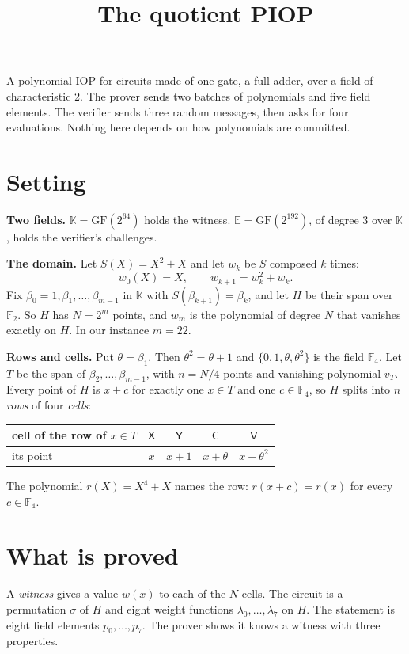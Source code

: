 \documentclass[11pt]{article}
\title{\vspace{-2.5em}The quotient PIOP}
\author{}
\date{\vspace{-3.5em}}
\newcommand{\K}{\mathbb{K}}
\newcommand{\E}{\mathbb{E}}
\newcommand{\F}{\mathbb{F}}
\newcommand{\cX}{\mathsf{X}}
\newcommand{\cY}{\mathsf{Y}}
\newcommand{\cC}{\mathsf{C}}
\newcommand{\cV}{\mathsf{V}}
\newcommand{\head}[1]{\par\vspace{0.35em}\textbf{#1}\enspace}
\begin{document}
\maketitle

A polynomial IOP for circuits made of one gate, a full adder, over a field of characteristic 2. The prover sends two batches of polynomials and five field elements. The verifier sends three random messages, then asks for four evaluations. Nothing here depends on how polynomials are committed.

\section{Setting}

\head{Two fields.} $\K = \mathrm{GF}(2^{64})$ holds the witness. $\E = \mathrm{GF}(2^{192})$, of degree 3 over $\K$, holds the verifier's challenges.

\head{The domain.} Let $S(X) = X^2 + X$ and let $w_k$ be $S$ composed $k$ times:
\[
  w_0(X) = X, \qquad w_{k+1} = w_k^2 + w_k .
\]
Fix $\beta_0 = 1, \beta_1, \dots, \beta_{m-1}$ in $\K$ with $S(\beta_{k+1}) = \beta_k$, and let $H$ be their span over $\F_2$. So $H$ has $N = 2^m$ points, and $w_m$ is the polynomial of degree $N$ that vanishes exactly on $H$. In our instance $m = 22$.

\head{Rows and cells.} Put $\theta = \beta_1$. Then $\theta^2 = \theta + 1$ and $\{0, 1, \theta, \theta^2\}$ is the field $\F_4$. Let $T$ be the span of $\beta_2, \dots, \beta_{m-1}$, with $n = N/4$ points and vanishing polynomial $v_T$. Every point of $H$ is $x + c$ for exactly one $x \in T$ and one $c \in \F_4$, so $H$ splits into $n$ \emph{rows} of four \emph{cells}:
\begin{center}
\begin{tabular}{@{}l@{\qquad}cccc@{}}
\toprule
cell of the row of $x \in T$ & $\cX$ & $\cY$ & $\cC$ & $\cV$ \\
\midrule
its point & $x$ & $x + 1$ & $x + \theta$ & $x + \theta^2$ \\
\bottomrule
\end{tabular}
\end{center}
The polynomial $r(X) = X^4 + X$ names the row: $r(x + c) = r(x)$ for every $c \in \F_4$.

\section{What is proved}

A \emph{witness} gives a value $w(x)$ to each of the $N$ cells. The circuit is a permutation $\sigma$ of $H$ and eight weight functions $\lambda_0, \dots, \lambda_7$ on $H$. The statement is eight field elements $p_0, \dots, p_7$. The prover shows it knows a witness with three properties.
\end{document}
